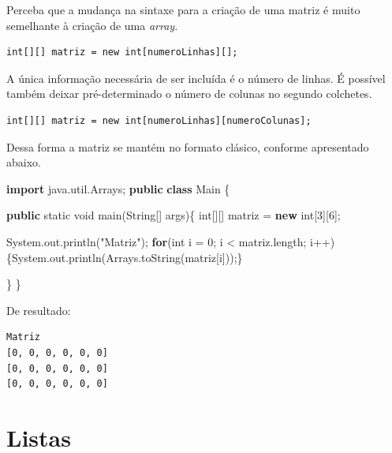 \documentclass[
]{book}
\newenvironment{Shaded}{\begin{snugshade}}{\end{snugshade}}
\newcommand{\BuiltInTok}[1]{#1}
\newcommand{\DataTypeTok}[1]{\textcolor[rgb]{0.13,0.29,0.53}{#1}}
\newcommand{\DecValTok}[1]{\textcolor[rgb]{0.00,0.00,0.81}{#1}}
\newcommand{\FunctionTok}[1]{\textcolor[rgb]{0.00,0.00,0.00}{#1}}
\newcommand{\ImportTok}[1]{#1}
\newcommand{\KeywordTok}[1]{\textcolor[rgb]{0.13,0.29,0.53}{\textbf{#1}}}
\newcommand{\NormalTok}[1]{#1}
\newcommand{\StringTok}[1]{\textcolor[rgb]{0.31,0.60,0.02}{#1}}
\begin{document}
Perceba que a mudança na sintaxe para a criação de uma matriz é muito semelhante à criação de uma \emph{array}.

\begin{verbatim}
int[][] matriz = new int[numeroLinhas][];
\end{verbatim}

A única informação necessária de ser incluída é o número de linhas. É possível também deixar pré-determinado o número de colunas no segundo colchetes.

\begin{verbatim}
int[][] matriz = new int[numeroLinhas][numeroColunas];
\end{verbatim}

Dessa forma a matriz se mantém no formato clásico, conforme apresentado abaixo.

\begin{Shaded}
\begin{Highlighting}[]
\KeywordTok{import}\ImportTok{ java.util.Arrays;}
\KeywordTok{public} \KeywordTok{class}\NormalTok{ Main \{}

    \KeywordTok{public} \DataTypeTok{static} \DataTypeTok{void} \FunctionTok{main}\NormalTok{(}\BuiltInTok{String}\NormalTok{[] args)\{}
        \DataTypeTok{int}\NormalTok{[][] matriz = }\KeywordTok{new} \DataTypeTok{int}\NormalTok{[}\DecValTok{3}\NormalTok{][}\DecValTok{6}\NormalTok{];}

        \BuiltInTok{System}\NormalTok{.}\FunctionTok{out}\NormalTok{.}\FunctionTok{println}\NormalTok{(}\StringTok{"Matriz"}\NormalTok{);}
        \KeywordTok{for}\NormalTok{(}\DataTypeTok{int}\NormalTok{ i = }\DecValTok{0}\NormalTok{; i < matriz.}\FunctionTok{length}\NormalTok{; i++) \{}\BuiltInTok{System}\NormalTok{.}\FunctionTok{out}\NormalTok{.}\FunctionTok{println}\NormalTok{(}\BuiltInTok{Arrays}\NormalTok{.}\FunctionTok{toString}\NormalTok{(matriz[i]));\}}

\NormalTok{    \}}
\NormalTok{\}}
\end{Highlighting}
\end{Shaded}

De resultado:

\begin{verbatim}
Matriz
[0, 0, 0, 0, 0, 0]
[0, 0, 0, 0, 0, 0]
[0, 0, 0, 0, 0, 0]
\end{verbatim}

\hypertarget{listas}{%
\section{Listas}\label{listas}}
\end{document}
